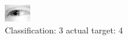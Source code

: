 \begin{figure}[h!]
\begin{center}
\includegraphics[width=0.60\columnwidth]{figures/ID2521_class_3_target_4.png}
\end{center}
\caption{ Classification: 3 actual target: 4}
\label{fig:ID2521_class_3_target_4}
\end{figure}
